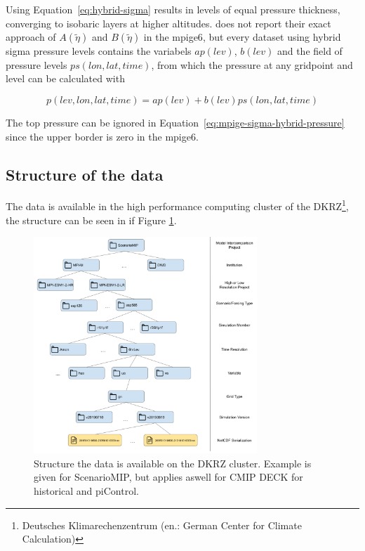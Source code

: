 Using Equation~\ref{eq:hybrid-sigma} results in levels of equal pressure thickness, converging to isobaric layers at higher altitudes. 
 does not report their exact approach of $A(\tilde{\eta})$ and $B(\tilde{\eta})$ in the \ac{mpige6}, but every dataset using hybrid sigma pressure levels contains the variabels $ap(lev)$, $b(lev)$ and the field of pressure levels $ps(lon, lat, time)$, from which the pressure at any gridpoint and level can be calculated with 

\begin{equation}
\label{eq:mpige-sigma-hybrid-pressure}
p(lev, lon, lat, time) = ap(lev) + b(lev) ps(lon, lat, time)
\end{equation}


The top pressure can be ignored in Equation~\ref{eq:mpige-sigma-hybrid-pressure} since the upper border is zero in the \ac{mpige6}.


\subsection{Structure of the data}

The data is available in the high performance computing cluster of the DKRZ\footnote{Deutsches Klimarechenzentrum (en.: German Center for Climate Calculation)}, the structure can be seen in if Figure \ref{fig:data-structure}.

\begin{figure}[htb]
  \begin{center}
    \includegraphics[width=0.75\textwidth]{figures/data_structure.png}
  \end{center}
  \caption{Structure the data is available on the DKRZ cluster. Example is given for ScenarioMIP, but applies aswell for CMIP DECK for historical and piControl.}\label{fig:data-structure}
\end{figure}

